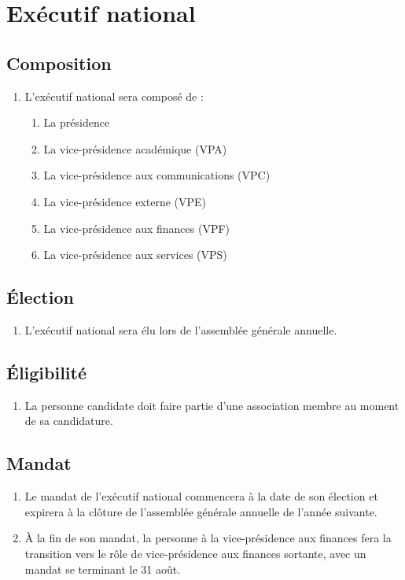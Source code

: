 \section{Exécutif national}
\label{executif-national}

\subsection{Composition}
\label{executif-national-composition}

\begin{enumerate}
 \item L'exécutif national sera composé de :
  \begin{enumerate}
   \item La présidence
   \item La vice-présidence académique (VPA)
   \item La vice-présidence aux communications (VPC)
   \item La vice-présidence externe (VPE)
   \item La vice-présidence aux finances (VPF)
   \item La vice-présidence aux services (VPS)
  \end{enumerate}
\end{enumerate}

\subsection{Élection}
\label{executif-national-election}

\begin{enumerate}
 \item L'exécutif national sera élu lors de l'assemblée générale annuelle.
\end{enumerate}

\subsection{Éligibilité}
\label{executif-national-eligibilite}

\begin{enumerate}
 \item La personne candidate doit faire partie d'une association membre au moment de sa candidature.
\end{enumerate}

\subsection{Mandat}
\label{executif-national-mandat}

\begin{enumerate}
 \item Le mandat de l'exécutif national commencera à la date de son élection et expirera à la clôture de l'assemblée générale annuelle de l'année suivante.
 \item À la fin de son mandat, la personne à la vice-présidence aux finances fera la transition vers le rôle de vice-présidence aux finances sortante, avec un mandat se terminant le 31 août.
\end{enumerate}
